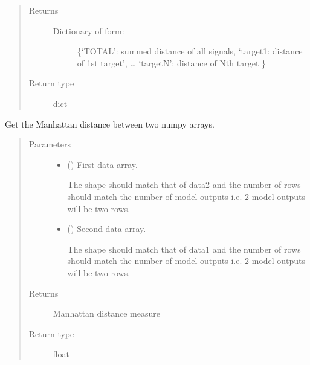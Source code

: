 \documentclass[letterpaper,10pt,english]{sphinxmanual}
\begin{document}
\begin{fulllineitems}
\begin{quote}
\begin{description}
\begin{itemize}
\end{itemize}

\item[{Returns}] \leavevmode

 \textendash{}
\begin{description}
\item[{Dictionary of form:}] \leavevmode
\{‘TOTAL’: summed distance of all signals,
‘target1: distance of 1st target’,
…
‘targetN’: distance of Nth target
\}

\end{description}


\item[{Return type}] \leavevmode
dict

\end{description}\end{quote}

\end{fulllineitems}


\begin{fulllineitems}
\label{\detokenize{abc:bayescmd.abc.distances.manhattan_dist}}
Get the Manhattan distance between two numpy arrays.
\begin{quote}\begin{description}
\item[{Parameters}] \leavevmode\begin{itemize}
\item {} 
 () \textendash{} 
First data array.

The shape should match that of data2 and the number of rows should
match the number of model outputs i.e. 2 model outputs will be two
rows.


\item {} 
 () \textendash{} 
Second data array.

The shape should match that of data1 and the number of rows should
match the number of model outputs i.e. 2 model outputs will be two
rows.


\end{itemize}

\item[{Returns}] \leavevmode
{} \textendash{} Manhattan distance measure

\item[{Return type}] \leavevmode
float

\end{description}\end{quote}

\end{fulllineitems}
\end{document}
